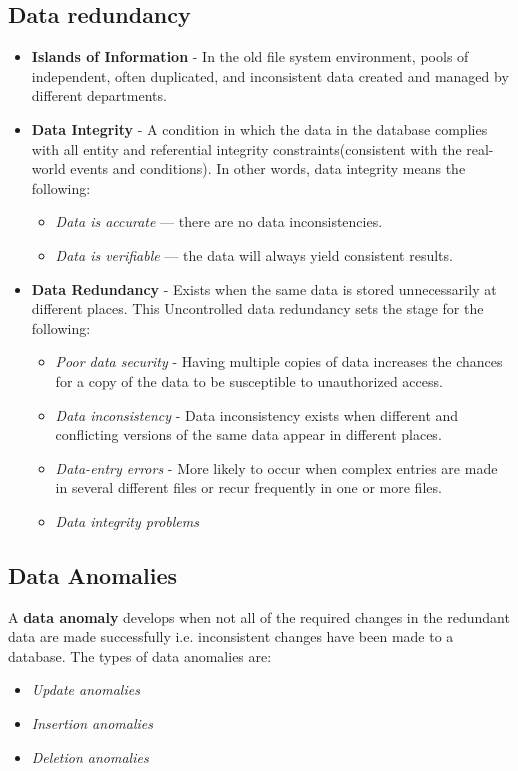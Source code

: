 \documentclass[a4paper, 12pt, titlepage]{report}
\begin{document}
\subsection{Data redundancy}
\begin{itemize}
\item \textbf{Islands of Information} - In the old file system environment, pools of independent, often duplicated, and inconsistent data created and managed by different departments.
\item \textbf{Data Integrity} - A condition in which the data in the database complies with all entity and referential integrity constraints(consistent with the real-world events and conditions). In other words, data integrity means the following:
\begin{itemize}
\item \emph{Data is accurate} — there are no data inconsistencies.
\item \emph{Data is verifiable} — the data will always yield consistent results.
\end{itemize}
\item \textbf{Data Redundancy} - Exists when the same data is stored unnecessarily at different places. This Uncontrolled data redundancy sets the stage for the following:
\begin{itemize}
\item \emph{Poor data security} - Having multiple copies of data increases the chances for a copy of the data to be susceptible to unauthorized access.
\item \emph{Data inconsistency} - Data inconsistency exists when different and conflicting versions of the same data appear in different places.
\item \emph{Data-entry errors} - More likely to occur when complex entries are made in several different files or recur frequently in one or more files.
\item \emph{Data integrity problems}
\end{itemize}
\end{itemize}
\subsection{Data Anomalies}
A \textbf{data anomaly} develops when not all of the required changes in the redundant data are made successfully i.e. inconsistent changes have been made to a database. The types of data anomalies are:
\begin{itemize}
\item \emph{Update anomalies}
\item \emph{Insertion anomalies}
\item \emph{Deletion anomalies}
\end{itemize}
\pagebreak
\end{document}
